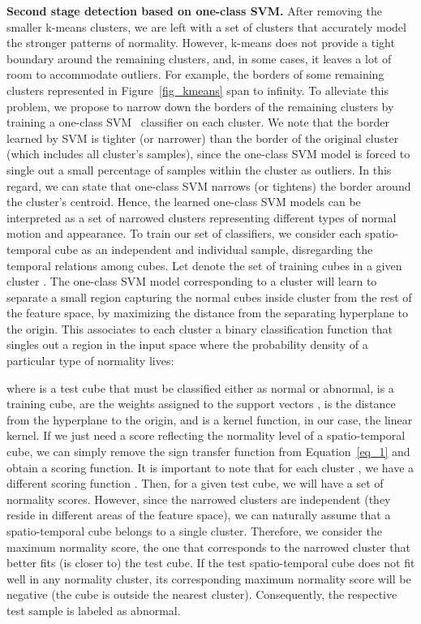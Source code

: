 \documentclass[10pt,twocolumn,letterpaper]{article}
\begin{document}
\noindent
{\bf Second stage detection based on one-class SVM.}
After removing the smaller k-means clusters, we are left with a set of clusters  that accurately model the stronger patterns of normality. However, k-means does not provide a tight boundary around the remaining clusters, and, in some cases, it leaves a lot of room to accommodate outliers. For example, the borders of some remaining clusters represented in Figure~\ref{fig_kmeans} span to infinity. To alleviate this problem, we propose to narrow down the borders of the remaining clusters by training a one-class SVM~\cite{Scholkopf-2001} classifier on each cluster. We note that the border learned by SVM is tighter (or narrower) than the border of the original cluster (which includes all cluster's samples), since the one-class SVM model is forced to single out a small percentage of samples within the cluster as outliers. In this regard, we can state that one-class SVM narrows (or tightens) the border around the cluster's centroid. Hence, the learned one-class SVM models can be interpreted as a set of narrowed clusters representing different types of normal motion and appearance. To train our set of classifiers, we consider each spatio-temporal cube as an independent and individual sample, disregarding the temporal relations among cubes. Let  denote the set of training cubes in a given cluster . The one-class SVM model corresponding to a cluster  will learn to separate a small region capturing the normal cubes inside cluster  from the rest of the feature space, by maximizing the distance from the separating hyperplane to the origin. This associates to each cluster a binary classification function  that singles out a region in the input space where the probability density of a particular type of normality lives:

where  is a test cube that must be classified either as normal or abnormal,  is a training cube,  are the weights assigned to the support vectors ,  is the distance from the hyperplane to the origin, and  is a kernel function, in our case, the linear kernel. If we just need a score reflecting the normality level of a spatio-temporal cube, we can simply remove the sign transfer function from Equation~\eqref{eq_1} and obtain a scoring function. It is important to note that for each cluster , we have a different scoring function . Then, for a given test cube, we will have a set of  normality scores. However, since the narrowed clusters are independent (they reside in different areas of the feature space), we can naturally assume that a spatio-temporal cube belongs to a single cluster. Therefore, we consider the maximum normality score, the one that corresponds to the narrowed cluster that better fits (is closer to) the test cube. If the test spatio-temporal cube does not fit well in any normality cluster, its corresponding maximum normality score will be negative (the cube is outside the nearest cluster). Consequently, the respective test sample is labeled as abnormal.
\end{document}
